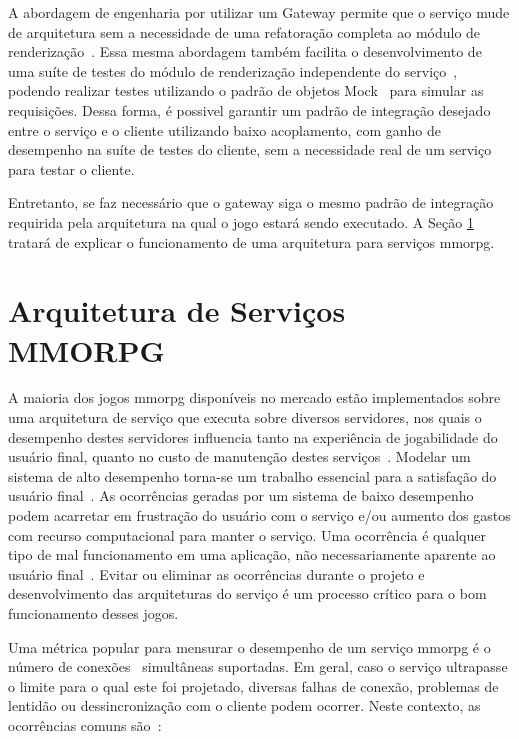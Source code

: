 A abordagem de engenharia por utilizar um Gateway permite que o serviço mude de arquitetura sem a necessidade de uma refatoração completa ao módulo de renderização~\cite{albion_online_unite, stephenclarkewillson2017}.
%
Essa mesma abordagem também facilita o desenvolvimento de uma suíte de testes do módulo de renderização independente do serviço~\cite{Freeman2009Oct}, podendo realizar testes utilizando o padrão de objetos Mock~\cite{Beck2004Nov} para simular as requisições.
%
Dessa forma, é possivel garantir um padrão de integração desejado entre o serviço e o cliente utilizando baixo acoplamento, com ganho de desempenho na suíte de testes do cliente, sem a necessidade real de um serviço para testar o cliente.



Entretanto, se faz necessário que o gateway siga o mesmo padrão de integração requirida pela arquitetura na qual o jogo estará sendo executado.
%
A Seção \ref{sec:arquiteturas} tratará de explicar o funcionamento de uma arquitetura para serviços \ac{mmorpg}.



\section{Arquitetura de Serviços MMORPG}
\label{sec:arquiteturas}



A maioria dos jogos \ac{mmorpg} disponíveis no mercado estão implementados sobre uma arquitetura de serviço que executa sobre diversos servidores\cite{stephenclarkewillson2017}, nos quais o desempenho destes servidores influencia tanto na experiência de jogabilidade do usuário final, quanto no custo de manutenção destes serviços~\cite{1417630}.
%
Modelar um sistema de alto desempenho torna-se um trabalho essencial para a satisfação do usuário final~\cite{1417630}.
%
As ocorrências geradas por um sistema de baixo desempenho podem acarretar em frustração do usuário com o serviço e/ou aumento dos gastos com recurso computacional para manter o serviço.
%
Uma ocorrência é qualquer tipo de mal funcionamento em uma aplicação, não necessariamente aparente ao usuário final~\cite{1417630}.
%
Evitar ou eliminar as ocorrências durante o projeto e desenvolvimento das arquiteturas do serviço é um processo crítico para o bom funcionamento desses jogos.



Uma métrica popular para mensurar o desempenho de um serviço \ac{mmorpg} é o número de conexões~\cite{1417630} simultâneas suportadas.
%
Em geral, caso o serviço ultrapasse o limite para o qual este foi projetado, diversas falhas de conexão, problemas de lentidão ou dessincronização com o cliente podem ocorrer.
%
Neste contexto, as ocorrências comuns são~\cite{1417630}:





